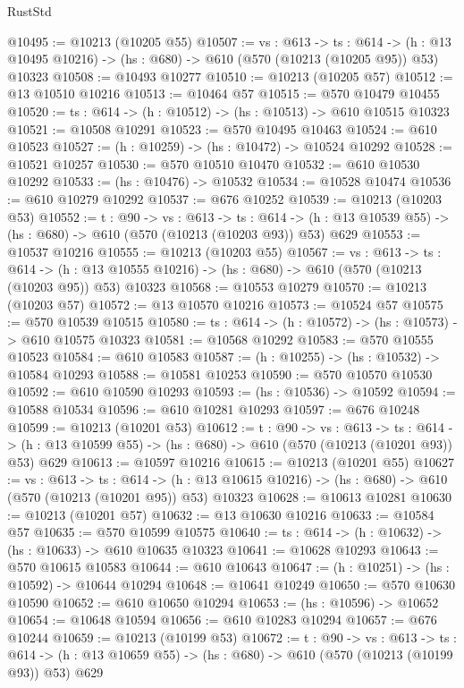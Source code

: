 \begin{lexlean}{RustStd}
\begin{coremodule}
@10495 := @10213 (@10205 @55)
@10507 := {vs : @613} ->
  {ts : @614} ->
  (h : @13 @10495 @10216) -> (hs : @680) -> @610 (@570 (@10213 (@10205 @95)) @53) @10323
@10508 := @10493 @10277
@10510 := @10213 (@10205 @57)
@10512 := @13 @10510 @10216
@10513 := @10464 @57
@10515 := @570 @10479 @10455
@10520 := {ts : @614} -> (h : @10512) -> (hs : @10513) -> @610 @10515 @10323
@10521 := @10508 @10291
@10523 := @570 @10495 @10463
@10524 := @610 @10523
@10527 := (h : @10259) -> (hs : @10472) -> @10524 @10292
@10528 := @10521 @10257
@10530 := @570 @10510 @10470
@10532 := @610 @10530 @10292
@10533 := (hs : @10476) -> @10532
@10534 := @10528 @10474
@10536 := @610 @10279 @10292
@10537 := @676 @10252
@10539 := @10213 (@10203 @53)
@10552 := {t : @90} ->
  {vs : @613} ->
  {ts : @614} -> (h : @13 @10539 @55) -> (hs : @680) -> @610 (@570 (@10213 (@10203 @93)) @53) @629
@10553 := @10537 @10216
@10555 := @10213 (@10203 @55)
@10567 := {vs : @613} ->
  {ts : @614} ->
  (h : @13 @10555 @10216) -> (hs : @680) -> @610 (@570 (@10213 (@10203 @95)) @53) @10323
@10568 := @10553 @10279
@10570 := @10213 (@10203 @57)
@10572 := @13 @10570 @10216
@10573 := @10524 @57
@10575 := @570 @10539 @10515
@10580 := {ts : @614} -> (h : @10572) -> (hs : @10573) -> @610 @10575 @10323
@10581 := @10568 @10292
@10583 := @570 @10555 @10523
@10584 := @610 @10583
@10587 := (h : @10255) -> (hs : @10532) -> @10584 @10293
@10588 := @10581 @10253
@10590 := @570 @10570 @10530
@10592 := @610 @10590 @10293
@10593 := (hs : @10536) -> @10592
@10594 := @10588 @10534
@10596 := @610 @10281 @10293
@10597 := @676 @10248
@10599 := @10213 (@10201 @53)
@10612 := {t : @90} ->
  {vs : @613} ->
  {ts : @614} -> (h : @13 @10599 @55) -> (hs : @680) -> @610 (@570 (@10213 (@10201 @93)) @53) @629
@10613 := @10597 @10216
@10615 := @10213 (@10201 @55)
@10627 := {vs : @613} ->
  {ts : @614} ->
  (h : @13 @10615 @10216) -> (hs : @680) -> @610 (@570 (@10213 (@10201 @95)) @53) @10323
@10628 := @10613 @10281
@10630 := @10213 (@10201 @57)
@10632 := @13 @10630 @10216
@10633 := @10584 @57
@10635 := @570 @10599 @10575
@10640 := {ts : @614} -> (h : @10632) -> (hs : @10633) -> @610 @10635 @10323
@10641 := @10628 @10293
@10643 := @570 @10615 @10583
@10644 := @610 @10643
@10647 := (h : @10251) -> (hs : @10592) -> @10644 @10294
@10648 := @10641 @10249
@10650 := @570 @10630 @10590
@10652 := @610 @10650 @10294
@10653 := (hs : @10596) -> @10652
@10654 := @10648 @10594
@10656 := @610 @10283 @10294
@10657 := @676 @10244
@10659 := @10213 (@10199 @53)
@10672 := {t : @90} ->
  {vs : @613} ->
  {ts : @614} -> (h : @13 @10659 @55) -> (hs : @680) -> @610 (@570 (@10213 (@10199 @93)) @53) @629

\end{coremodule}
\end{lexlean}
